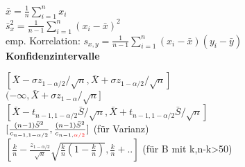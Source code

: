 \documentclass[10pt,twocolumn,a4paper]{article}
\begin{document}
\begin{flushleft}
$\bar{x} = \frac{1}{n} \sum_{i=1}^{n}x_i$\\
$\bar{s}_x^2 = \frac{1}{n-1} \sum_{i=1}^{n}(x_i-\bar{x})^2$\\
emp. Korrelation: $s_{x,y} = \frac{1}{n-1} \sum_{i=1}^{n}(x_i-\bar{x})(y_i-\bar{y})$\\

\textbf{Konfidenzintervalle}

$[\bar{X}-\sigma z_{1-\alpha/2}/\sqrt{n}, \bar{X}+\sigma z_{1-\alpha/2}/\sqrt{n}]$\\
$(-\infty, \bar{X}+\sigma z_{1-\alpha}/\sqrt{n}]$\\
$[\bar{X} - t_{n-1,1-\alpha/2}\bar{S}/\sqrt{n}, \bar{X} + t_{n-1,1-\alpha/2}\bar{S}/\sqrt{n}]$\\
$[\frac{(n-1)\bar{S}^2}{c_{n-1,1-\alpha/2}},\frac{(n-1)\bar{S}^2}{c_{n-1,\textcolor{red}{\alpha/2}}}]$ (für Varianz)\\
$[\frac{k}{n}-\frac{z_{1-\alpha/2}}{\sqrt{n}}\sqrt{\frac{k}{n}(1-\frac{k}{n})}, \frac{k}{n}+..]$ (für B mit k,n-k>50)\\


\end{flushleft}
\end{document}
